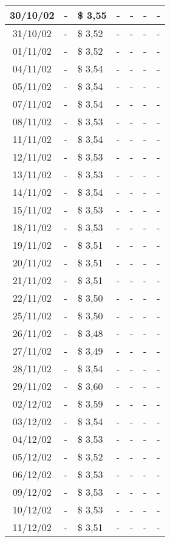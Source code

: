 \begin{center}
\begin{longtable}{|c|p{1.5cm}|p{1.5cm}|p{1.5cm}|p{1.5cm}|p{1.5cm}|p{1.5cm}|}
30/10/02 & - & \$ 3,55 & - & - & - & - \\ \hline
31/10/02 & - & \$ 3,52 & - & - & - & - \\ \hline
01/11/02 & - & \$ 3,52 & - & - & - & - \\ \hline
04/11/02 & - & \$ 3,54 & - & - & - & - \\ \hline
05/11/02 & - & \$ 3,54 & - & - & - & - \\ \hline
07/11/02 & - & \$ 3,54 & - & - & - & - \\ \hline
08/11/02 & - & \$ 3,53 & - & - & - & - \\ \hline
11/11/02 & - & \$ 3,54 & - & - & - & - \\ \hline
12/11/02 & - & \$ 3,53 & - & - & - & - \\ \hline
13/11/02 & - & \$ 3,53 & - & - & - & - \\ \hline
14/11/02 & - & \$ 3,54 & - & - & - & - \\ \hline
15/11/02 & - & \$ 3,53 & - & - & - & - \\ \hline
18/11/02 & - & \$ 3,53 & - & - & - & - \\ \hline
19/11/02 & - & \$ 3,51 & - & - & - & - \\ \hline
20/11/02 & - & \$ 3,51 & - & - & - & - \\ \hline
21/11/02 & - & \$ 3,51 & - & - & - & - \\ \hline
22/11/02 & - & \$ 3,50 & - & - & - & - \\ \hline
25/11/02 & - & \$ 3,50 & - & - & - & - \\ \hline
26/11/02 & - & \$ 3,48 & - & - & - & - \\ \hline
27/11/02 & - & \$ 3,49 & - & - & - & - \\ \hline
28/11/02 & - & \$ 3,54 & - & - & - & - \\ \hline
29/11/02 & - & \$ 3,60 & - & - & - & - \\ \hline
02/12/02 & - & \$ 3,59 & - & - & - & - \\ \hline
03/12/02 & - & \$ 3,54 & - & - & - & - \\ \hline
04/12/02 & - & \$ 3,53 & - & - & - & - \\ \hline
05/12/02 & - & \$ 3,52 & - & - & - & - \\ \hline
06/12/02 & - & \$ 3,53 & - & - & - & - \\ \hline
09/12/02 & - & \$ 3,53 & - & - & - & - \\ \hline
10/12/02 & - & \$ 3,53 & - & - & - & - \\ \hline
11/12/02 & - & \$ 3,51 & - & - & - & - \\ \hline

\end{longtable}
\end{center}
